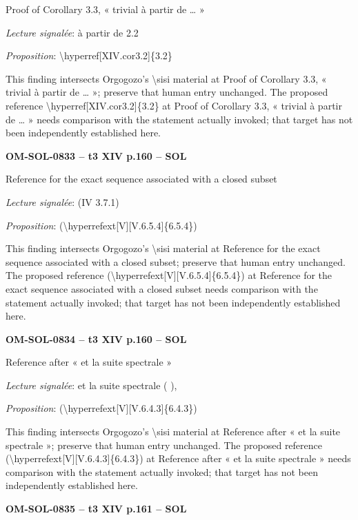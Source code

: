 Proof of Corollary 3.3, « trivial à partir de … »\par
\emph{Lecture signalée}: à partir de 2.2\par
\emph{Proposition}: \textbackslash{}hyperref[XIV.cor3.2]\{3.2\}\par
This finding intersects Orgogozo's \textbackslash{}sisi material at Proof of Corollary 3.3, « trivial à partir de … »; preserve that human entry unchanged. The proposed reference \textbackslash{}hyperref[XIV.cor3.2]\{3.2\} at Proof of Corollary 3.3, « trivial à partir de … » needs comparison with the statement actually invoked; that target has not been independently established here.\par
\par\noindent\textbf{OM-SOL-0833 -- t3 XIV p.160 -- SOL}\par
Reference for the exact sequence associated with a closed subset\par
\emph{Lecture signalée}: (IV 3.7.1)\par
\emph{Proposition}: (\textbackslash{}hyperrefext[V][V.6.5.4]\{6.5.4\})\par
This finding intersects Orgogozo's \textbackslash{}sisi material at Reference for the exact sequence associated with a closed subset; preserve that human entry unchanged. The proposed reference (\textbackslash{}hyperrefext[V][V.6.5.4]\{6.5.4\}) at Reference for the exact sequence associated with a closed subset needs comparison with the statement actually invoked; that target has not been independently established here.\par
\par\noindent\textbf{OM-SOL-0834 -- t3 XIV p.160 -- SOL}\par
Reference after « et la suite spectrale »\par
\emph{Lecture signalée}: et la suite spectrale ( ),\par
\emph{Proposition}: (\textbackslash{}hyperrefext[V][V.6.4.3]\{6.4.3\})\par
This finding intersects Orgogozo's \textbackslash{}sisi material at Reference after « et la suite spectrale »; preserve that human entry unchanged. The proposed reference (\textbackslash{}hyperrefext[V][V.6.4.3]\{6.4.3\}) at Reference after « et la suite spectrale » needs comparison with the statement actually invoked; that target has not been independently established here.\par
\par\noindent\textbf{OM-SOL-0835 -- t3 XIV p.161 -- SOL}\par
